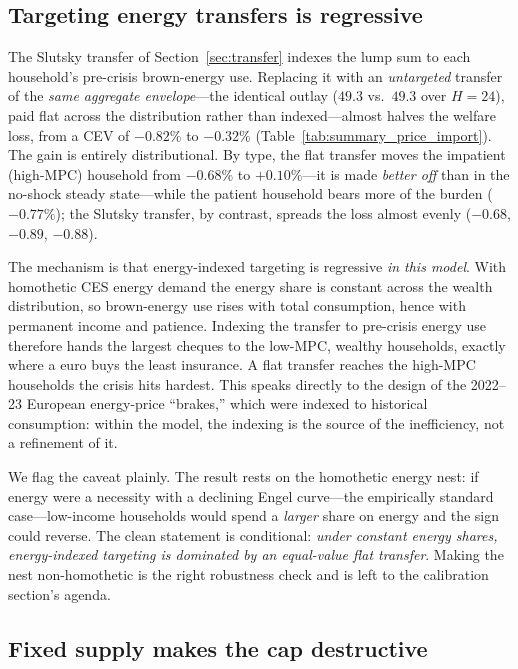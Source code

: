 \documentclass[11pt,a4paper]{article}
\begin{document}
\subsection{Targeting energy transfers is regressive}
\label{sec:flat}

The Slutsky transfer of Section~\ref{sec:transfer} indexes the lump sum to each
household's pre-crisis brown-energy use. Replacing it with an
\emph{untargeted} transfer of the \emph{same aggregate envelope}---the identical
outlay ($49.3$ vs.\ $49.3$ over $H=24$), paid flat across the distribution rather
than indexed---almost halves the welfare loss, from a CEV of $-0.82\%$ to
$-0.32\%$ (Table~\ref{tab:summary_price_import}). The gain is entirely
distributional. By type, the flat transfer moves the impatient (high-MPC)
household from $-0.68\%$ to $+0.10\%$---it is made \emph{better off} than in the
no-shock steady state---while the patient household bears more of the burden
($-0.77\%$); the Slutsky transfer, by contrast, spreads the loss almost evenly
($-0.68$, $-0.89$, $-0.88$).

The mechanism is that energy-indexed targeting is regressive \emph{in this
model}. With homothetic CES energy demand the energy share is constant across the
wealth distribution, so brown-energy use rises with total consumption, hence with
permanent income and patience. Indexing the transfer to pre-crisis energy use
therefore hands the largest cheques to the low-MPC, wealthy households, exactly
where a euro buys the least insurance. A flat transfer reaches the high-MPC
households the crisis hits hardest. This speaks directly to the design of the
2022--23 European energy-price ``brakes,'' which were indexed to historical
consumption: within the model, the indexing is the source of the inefficiency,
not a refinement of it.

We flag the caveat plainly. The result rests on the homothetic energy nest: if
energy were a necessity with a declining Engel curve---the empirically standard
case---low-income households would spend a \emph{larger} share on energy and the
sign could reverse. The clean statement is conditional: \emph{under constant
energy shares, energy-indexed targeting is dominated by an equal-value flat
transfer}. Making the nest non-homothetic is the right robustness check and is
left to the calibration section's agenda.


\subsection{Fixed supply makes the cap destructive}
\end{document}
